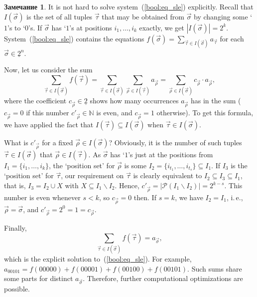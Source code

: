 \documentclass[12pt,notitlepage]{article}
\theoremstyle{plain}
\theoremstyle{definition}
\newtheorem{rem}[thm]{Замечание}
\theoremstyle{plain}
\newcommand{\N}{\mathbb{N}}
\newcommand{\sbs}{\subseteq}
\renewcommand{\setminus}{\smallsetminus}
\newcommand{\mP}{\mathcal{P}}
\newcommand{\ul}[1]{\underline{#1}}
\newcommand{\1}{\mathbf{1}}
\newcommand{\0}{\mathbf{0}}
\begin{document}
\begin{rem}\label{bool:coeff}
	It is not hard to solve system~(\ref{bool:eq_sle}) explicitly. Recall that $I(\vec \sigma)$ is the set of all tuples $\vec \tau$ that may be obtained from $\vec \sigma$ by changing some `$1$'s to `$0$'s. If $\vec \sigma$ has `$1$'s at positions $i_1, \ldots, i_k$ exactly, we get $|I(\vec\sigma)| = 2^k$. System~(\ref{bool:eq_sle}) contains the equations $f(\vec \sigma) = \sum_{\vec\tau \in I(\vec \sigma)} a_{\vec\tau}$ for each $\vec \sigma \in \ul{2}^n$.
	
	Now, let us consider the sum
	$$\sum_{\vec\tau \in I(\vec \sigma)} f(\vec\tau) = \sum_{\vec\tau \in I(\vec \sigma)} \sum_{\vec\rho \in I(\vec \tau)} a_{\vec\rho} = \sum_{\vec\rho \in I(\vec \sigma)} c_{\vec \rho} \cdot a_{\vec \rho},$$
	where the coefficient $c_{\vec \rho} \in \ul{2}$ shows how many occurrences $a_{\vec \rho}$ has in the sum ($c_{\vec \rho} = 0$ if this number $c'_{\vec \rho} \in \N$ is even, and $c_{\vec \rho} = 1$ otherwise). To get this formula, we have applied the fact that $I(\vec \tau) \sbs I(\vec \sigma)$ when $\vec \tau \in I(\vec \sigma)$.
	
	What is $c'_{\vec \rho}$ for a fixed $\vec \rho \in I(\vec \sigma)$? Obviously, it is the number of such tuples $\vec \tau \in I(\vec \sigma)$ that $\vec \rho \in I(\vec \tau)$. As $\vec \sigma$ has `$1$'s just at the positions from $I_1 = \{i_1, \ldots, i_k\}$, the `position set' for $\vec\rho$ is some $I_2 = \{ i_{t_1}, \ldots, i_{t_s} \} \sbs I_1$. If $I_3$ is the `position set' for $\vec \tau$, our requirement on $\vec \tau$ is clearly equivalent to $I_2 \sbs I_3 \sbs I_1$, that is, $I_3 = I_2 \cup X$ with $X \sbs I_1 \setminus I_2$. Hence, $c'_{\vec\rho} =  |\mP(I_1 \setminus I_2)| = 2^{k - s}$. This number is even whenever $s < k$, so $c_{\vec \rho} = 0$ then. If $s = k$, we have $I_2 = I_1$, i.\,e., $\vec \rho = \vec \sigma$, and $c'_{\vec \rho} = 2^0 = 1 = c_{\vec \rho}$.
	
	Finally, $$\sum_{\vec\tau \in I(\vec \sigma)} f(\vec\tau) = a_{\vec \sigma},$$ which is the explicit solution to~(\ref{bool:eq_sle}). For example, $a_{00101} = f(00000) + f(00001) + f(00100) + f(00101)$. Such sums share some parts for distinct $a_{\vec \sigma}$. Therefore, further computational optimizations are possible.
\end{rem}
\end{document}
